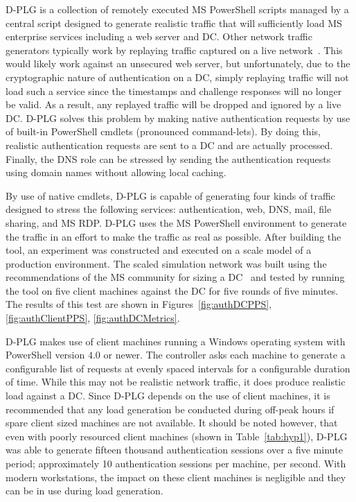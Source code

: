 \ac{D-PLG} is a collection of remotely executed \ac{MS} PowerShell scripts
managed by a central script designed to generate realistic traffic that will
sufficiently load \ac{MS} enterprise services including a web server and
\ac{DC}.  Other network traffic generators typically work by replaying traffic
captured on a live network~\cite{jordan2016}.  This would likely work against
an unsecured web server, but unfortunately, due to the cryptographic nature of
authentication on a \ac{DC}, simply replaying traffic will not load such a
service since the timestamps and challenge responses will no longer be valid.
As a result, any replayed traffic will be dropped and ignored by a live
\ac{DC}.  \ac{D-PLG} solves this problem by making native authentication
requests by use of built-in PowerShell cmdlets (pronounced command-lets).  By
doing this, realistic authentication requests are sent to a \ac{DC} and are
actually processed.  Finally, the \ac{DNS} role can be stressed by sending the
authentication requests using domain names without allowing local caching.

By use of native cmdlets, \ac{D-PLG} is capable of generating four kinds of
traffic designed to stress the following services: authentication, web,
\ac{DNS}, mail, file sharing, and \ac{MS} \ac{RDP}.  \ac{D-PLG} uses the
\ac{MS} PowerShell environment to generate the traffic in an effort to make the
traffic as real as possible.  After building the tool, an experiment was
constructed and executed on a scale model of a production environment.  The
scaled simulation network was built using the recommendations of the \ac{MS}
community for sizing a \ac{DC}~\cite{mak12} and tested by running the tool on
five client machines against the \ac{DC} for five rounds of five minutes.  The
results of this test are shown in Figures~\ref{fig:authDCPPS},
\ref{fig:authClientPPS}, \ref{fig:authDCMetrics}.

\figAuthDCPPS{4in}
\figAuthClientPPS{4in}
\figAuthDCMetrics{4in}

\ac{D-PLG} makes use of client machines running a Windows operating system with
PowerShell version $4.0$ or newer.  The controller asks each machine to
generate a configurable list of requests at evenly spaced intervals for a
configurable duration of time.  While this may not be realistic network
traffic, it does produce realistic load against a \ac{DC}.  Since \ac{D-PLG}
depends on the use of client machines, it is recommended that any load
generation be conducted during off-peak hours if spare client sized machines
are not available.  It should be noted however, that even with poorly resourced
client machines (shown in Table~\ref{tab:hyp1}), \ac{D-PLG} was able to
generate fifteen thousand authentication sessions over a five minute period;
approximately 10 authentication sessions per machine, per second.  With modern
workstations, the impact on these client machines is negligible and they can be
in use during load generation.

